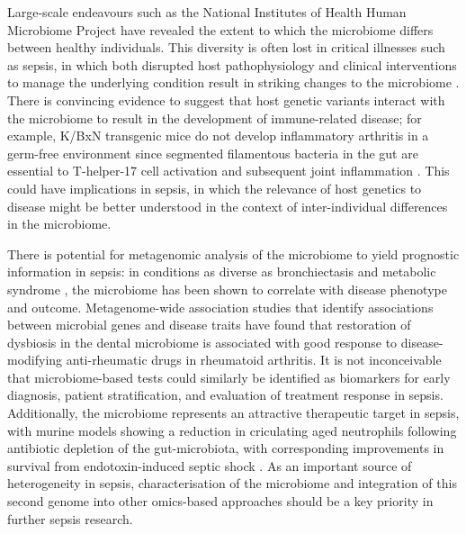 Large-scale endeavours such as the National Institutes of Health Human Microbiome Project \parencite{Peterson2009} have revealed the extent to which the microbiome differs between healthy individuals. This diversity is often lost in critical illnesses such as sepsis, in which both disrupted host pathophysiology and clinical interventions to manage the underlying condition result in striking changes to the microbiome \parencite{Dickson2016}. There is convincing evidence to suggest that host genetic variants interact with the microbiome to result in the development of immune-related disease; for example, K/BxN transgenic mice do not develop inflammatory arthritis in a germ-free environment since segmented filamentous bacteria in the gut are essential to T-helper-17 cell activation and subsequent joint inflammation \parencite{Wu2010}. This could have implications in sepsis, in which the relevance of host genetics to disease might be better understood in the context of inter-individual differences in the microbiome.

There is potential for metagenomic analysis of the microbiome to yield prognostic information in sepsis: in conditions as diverse as bronchiectasis \parencite{Rogers2014} and metabolic syndrome \parencite{LeChatelier2013}, the microbiome has been shown to correlate with disease phenotype and outcome. Metagenome-wide association studies \parencite{Zhang2015} that identify associations between microbial genes and disease traits have found that restoration of dysbiosis in the dental microbiome is associated with good response to disease-modifying anti-rheumatic drugs in rheumatoid arthritis. It is not inconceivable that microbiome-based tests could similarly be identified as biomarkers for early diagnosis, patient stratification, and evaluation of treatment response in sepsis. Additionally, the microbiome represents an attractive therapeutic target in sepsis, with murine models showing a reduction in criculating aged neutrophils following antibiotic depletion of the gut-microbiota, with corresponding improvements in survival from endotoxin-induced septic shock \parencite{Zhang2015a}. As an important source of heterogeneity in sepsis, characterisation of the microbiome and integration of this second genome \parencite{Grice2012} into other omics-based approaches should be a key priority in further sepsis research.

